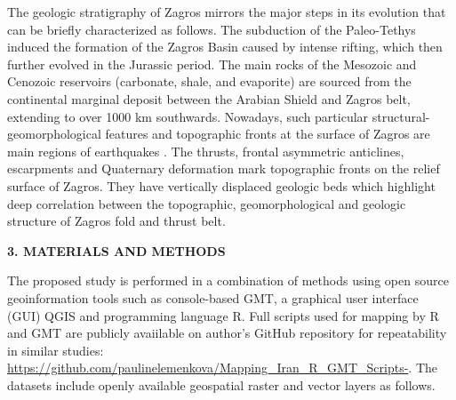 \documentclass[12pt,a4paper,oneside]{article}
\def \newsection{\vspace{12pt}\textbf}
\def \newpar{\vspace{6pt}}
\begin{document}
\newpar The geologic stratigraphy of Zagros mirrors the major steps in its evolution that can be briefly characterized as follows. The subduction of the Paleo-Tethys induced the formation of the Zagros Basin caused by intense rifting, which then further evolved in the Jurassic period. The main rocks of the Mesozoic and Cenozoic reservoirs (carbonate, shale, and evaporite) are sourced from the continental marginal deposit between the Arabian Shield and Zagros belt, extending to over 1000 km southwards. Nowadays, such particular structural-geomorphological features and topographic fronts at the surface of Zagros are main regions of earthquakes \citep{Berberian}. The thrusts, frontal asymmetric anticlines, escarpments and Quaternary deformation mark topographic fronts on the relief surface of Zagros. They have vertically displaced geologic beds which highlight deep correlation between the topographic, geomorphological and geologic structure of Zagros fold and thrust belt.

\newsection {3. MATERIALS AND METHODS}

\newpar The proposed study is performed in a combination of methods using open source geoinformation tools such as console-based GMT, a graphical user interface (GUI) QGIS and programming language R. Full scripts used for mapping by R and GMT are publicly avaiilable on author's GitHub repository for repeatability in similar studies: \href{https://github.com/paulinelemenkova/Mapping_Iran_R_GMT_Scripts-}{https://github.com/paulinelemenkova/Mapping\_Iran\_R\_GMT\_Scripts-}. The datasets include openly available geospatial raster and vector layers as follows. 
\end{document}
